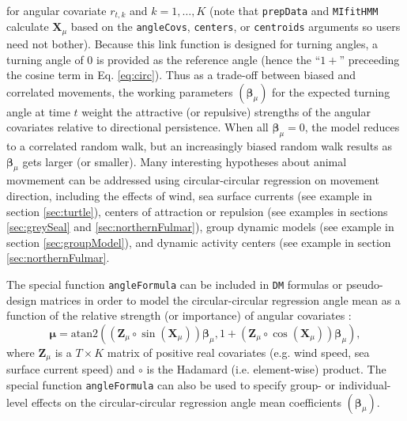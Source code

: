 \documentclass[12pt]{article}\usepackage[]{graphicx}\usepackage[]{color}
\begin{document}
for angular covariate $r_{t,k}$ and $k=1,\ldots,K$ (note that \verb|prepData| and \verb|MIfitHMM| calculate ${\mathbf X}_\mu$ based on the \verb|angleCovs|, \verb|centers|, or \verb|centroids| arguments so users need not bother). Because this link function is designed for turning angles, a turning angle of 0 is provided as the reference angle (hence the ``$1+$'' preceeding the cosine term in Eq. \ref{eq:circ}).  Thus as a trade-off between biased and correlated movements, the working parameters $({\boldsymbol \beta}_\mu)$ for the expected turning angle at time $t$ weight the attractive (or repulsive) strengths of the angular covariates relative to directional persistence.  When all ${\boldsymbol \beta}_\mu=0$, the model reduces to a correlated random walk, but an increasingly biased random walk results as ${\boldsymbol \beta}_\mu$ gets larger (or smaller). Many interesting hypotheses about animal movmement can be addressed using circular-circular regression on movement direction, including the effects of wind, sea surface currents (see example in section \ref{sec:turtle}), centers of attraction or repulsion (see examples in sections \ref{sec:greySeal} and \ref{sec:northernFulmar}), group dynamic models (see example in section \ref{sec:groupModel}), and dynamic activity centers (see example in section \ref{sec:northernFulmar}.

The special function \verb|angleFormula| can be included in \verb|DM| formulas or pseudo-design matrices in order to model the circular-circular regression angle mean as a function of the relative strength (or importance) of angular covariates \citep{RivestEtAl2016}:
\begin{equation}
  {\boldsymbol \mu}=\text{atan2}(({\mathbf Z}_\mu \circ \sin({\mathbf X}_\mu)){\boldsymbol \beta}_\mu,1+({\mathbf Z}_\mu \circ \cos({\mathbf X}_\mu)){\boldsymbol \beta}_\mu),
  \label{eq:circ2}
\end{equation}
where ${\mathbf Z}_\mu$ is a $T \times K$ matrix of positive real covariates (e.g. wind speed, sea surface current speed) and $\circ$ is the Hadamard (i.e. element-wise) product.  The special function \verb|angleFormula| can also be used to specify group- or individual-level effects on the circular-circular regression angle mean coefficients $({\boldsymbol \beta}_\mu)$.
\end{document}
